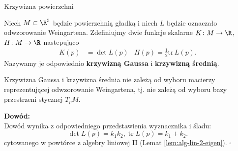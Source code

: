\begin{frame}{Krzywizna powierzchni}
\pause \begin{definicja}
Niech $M\subset \R^3$ będzie powierzchnią gładką i niech $L$ będzie oznaczało 
odwzorowanie Weingartena. \pause Zdefiniujmy dwie funkcje skalarne  $K\colon 
M\to \R$, $H\colon M\to \R$ nastepująco
\begin{align*}
K(p)&=\det L(p) & H(p)=\frac{1}{2}\text{tr}\, L(p).
\end{align*}
Nazywamy je odpowiednio \textbf{krzywizną Gaussa} i \textbf{krzywizną średnią}.
\end{definicja}

\end{frame}
\begin{frame}

\begin{lemat}
Krzywizna Gaussa i krzywizna średnia nie zależą od wyboru macierzy reprezentującej odwzorowanie Weingartena, tj. nie zależą od wyboru bazy przestrzeni stycznej $T_pM$.
\end{lemat}

\pause \textcolor{ared}{\textbf{Dowód: }}\\
Dowód wynika z odpowiedniego przedstawienia wyznacznika i śladu:
\[\det L(p)=k_1k_2,\operatorname{tr}L(p)=k_1 +k_2 .\]
cytowanego w powtórce z algebry liniowej II (Lemat \ref{lem:alg-lin-2-eigen}). \hfill $\square$

\end{frame}
